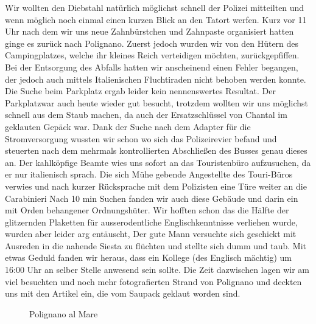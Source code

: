 Wir wollten den Diebstahl natürlich möglichst schnell der Polizei mitteilten und wenn möglich noch einmal einen kurzen Blick an den Tatort werfen.
Kurz vor 11 Uhr nach dem wir uns neue Zahnbürstchen und Zahnpaste organisiert hatten ginge es zurück nach Polignano.
Zuerst jedoch wurden wir von den Hütern des Campingplatzes, welche ihr kleines Reich verteidigen möchten, zurückgepfiffen.
Bei der Entsorgung des Abfalls hatten wir anscheinend einen Fehler begangen, der jedoch auch mittels Italienischen Fluchtiraden nicht behoben werden konnte.
Die Suche beim Parkplatz ergab leider kein nennenswertes Resultat.
Der \glqq Parkplatz\grqq war auch heute wieder gut besucht, trotzdem wollten wir uns möglichst schnell aus dem Staub machen, da auch der Ersatzschlüssel von Chantal im geklauten Gepäck war.
Dank der Suche nach dem Adapter für die Stromversorgung wussten wir schon wo sich das Polizeirevier befand und steuerten nach dem mehrmals kontrollierten Abschließen des Busses genau dieses an.
Der kahlköpfige Beamte wies uns sofort an das Touristenbüro aufzusuchen, da er nur italienisch sprach.
Die sich Mühe gebende Angestellte des Touri-Büros verwies und nach kurzer Rücksprache mit dem Polizisten eine Türe weiter an die Carabinieri
Nach 10 min Suchen fanden wir auch diese Gebäude und darin ein mit Orden behangener Ordnungshüter.
Wir hofften schon das die Hälfte der glitzernden Plaketten für ausserodentliche Englischkenntnisse verliehen wurde, wurden aber leider arg entäuscht, Der gute Mann versuchte sich geschickt mit Ausreden in die nahende Siesta zu flüchten und stellte sich dumm und taub.
Mit etwas Geduld fanden wir heraus, dass ein Kollege (des Englisch mächtig) um 16:00 Uhr an selber Stelle anwesend sein sollte.
Die Zeit dazwischen lagen wir am viel besuchten und noch mehr fotografierten Strand von Polignano und deckten uns mit den Artikel ein, die vom Saupack geklaut worden sind.

\begin{figure}[H]
   \centering
   \quad
   \quad
   \quad
   \caption[Polignano al Mare]{Polignano al Mare}
\end{figure}

